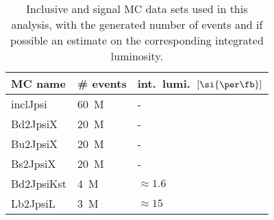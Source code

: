 %
\begin{table}
\centering
\caption{Inclusive and signal MC data sets used in this analysis, with the
generated number of events and if possible an estimate on the corresponding
integrated luminosity.}
\label{tab:measurement_of_sin2beta:data_preparation:datasamples:mc:samples}
\begin{tabular}{lll}
\toprule
\acs{MC} name & \# events & int.\ lumi.\ $[\si{\per\fb}]$ \\ 
\midrule
inclJpsi    & \SI{60}{M} & -             \\
Bd2JpsiX    & \SI{20}{M} & -             \\
Bu2JpsiX    & \SI{20}{M} & -             \\
Bs2JpsiX    & \SI{20}{M} & -             \\
Bd2JpsiKst  & \SI{4}{M}  & $\approx 1.6$ \\
Lb2JpsiL    & \SI{3}{M}  & $\approx 15$  \\
\bottomrule
\end{tabular}
\end{table}
